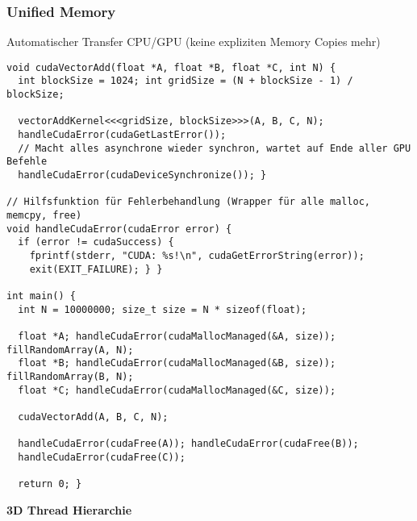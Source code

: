 \subsubsection{Unified Memory}
Automatischer Transfer CPU/GPU (keine expliziten Memory Copies mehr)
\begin{lstlisting}
void cudaVectorAdd(float *A, float *B, float *C, int N) {
  int blockSize = 1024; int gridSize = (N + blockSize - 1) / blockSize;

  vectorAddKernel<<<gridSize, blockSize>>>(A, B, C, N);
  handleCudaError(cudaGetLastError());
  // Macht alles asynchrone wieder synchron, wartet auf Ende aller GPU Befehle
  handleCudaError(cudaDeviceSynchronize()); }

// Hilfsfunktion für Fehlerbehandlung (Wrapper für alle malloc, memcpy, free)
void handleCudaError(cudaError error) {
  if (error != cudaSuccess) {
  	fprintf(stderr, "CUDA: %s!\n", cudaGetErrorString(error));
  	exit(EXIT_FAILURE); } }

int main() {
  int N = 10000000; size_t size = N * sizeof(float);

  float *A; handleCudaError(cudaMallocManaged(&A, size)); fillRandomArray(A, N);
  float *B; handleCudaError(cudaMallocManaged(&B, size)); fillRandomArray(B, N);
  float *C; handleCudaError(cudaMallocManaged(&C, size));

  cudaVectorAdd(A, B, C, N);

  handleCudaError(cudaFree(A)); handleCudaError(cudaFree(B));
  handleCudaError(cudaFree(C));

  return 0; }
\end{lstlisting}

\textbf{3D Thread Hierarchie}

